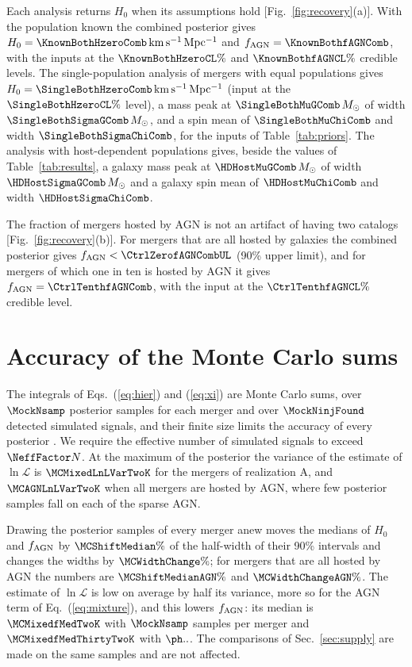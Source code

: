 \documentclass[aps,prd,reprint,superscriptaddress,nofootinbib,nolongbibliography,floatfix]{revtex4-2}
\newcommand{\kms}{\,\mathrm{km\,s^{-1}\,Mpc^{-1}}}
\newcommand{\Msun}{M_\odot}
\newcommand{\fagn}{f_{\rm AGN}}
\begin{document}
Each analysis returns $H_0$ when its assumptions hold [Fig.~\ref{fig:recovery}(a)]. %
With the population known the combined posterior gives $H_0=\KnownBothHzeroComb\kms$ and $\fagn=\KnownBothfAGNComb$, with the inputs at the $\KnownBothHzeroCL\%$ and $\KnownBothfAGNCL\%$ credible levels.
The single-population analysis of mergers with equal populations gives $H_0=\SingleBothHzeroComb\kms$ (input at the $\SingleBothHzeroCL\%$ level), a mass peak at $\SingleBothMuGComb\,\Msun$ of width $\SingleBothSigmaGComb\,\Msun$, and a spin mean of $\SingleBothMuChiComb$ and width $\SingleBothSigmaChiComb$, for the inputs of Table~\ref{tab:priors}.
The analysis with host-dependent populations gives, beside the values of Table~\ref{tab:results}, a galaxy mass peak at $\HDHostMuGComb\,\Msun$ of width $\HDHostSigmaGComb\,\Msun$ and a galaxy spin mean of $\HDHostMuChiComb$ and width $\HDHostSigmaChiComb$.

The fraction of mergers hosted by AGN is not an artifact of having two catalogs [Fig.~\ref{fig:recovery}(b)]. %
For mergers that are all hosted by galaxies the combined posterior gives $\fagn<\CtrlZerofAGNCombUL$ (90\% upper limit), and for mergers of which one in ten is hosted by AGN it gives $\fagn=\CtrlTenthfAGNComb$, with the input at the $\CtrlTenthfAGNCL\%$ credible level. %

\section{Accuracy of the Monte Carlo sums}
\label{app:mc}

The integrals of Eqs.~(\ref{eq:hier}) and (\ref{eq:xi}) are Monte Carlo sums, over $\MockNsamp$ posterior samples for each merger and over $\MockNinjFound$ detected simulated signals, and their finite size limits the accuracy of every posterior \cite{Farr:2019rap,Essick:2022ojx,Talbot:2023pex}.
We require the effective number of simulated signals \cite{Farr:2019rap} to exceed $\NeffFactor N$.
At the maximum of the posterior the variance of the estimate of $\ln\mathcal{L}$ is $\MCMixedLnLVarTwoK$ for the mergers of realization A, and $\MCAGNLnLVarTwoK$ when all mergers are hosted by AGN, where few posterior samples fall on each of the sparse AGN. %

Drawing the posterior samples of every merger anew moves the medians of $H_0$ and $\fagn$ by $\MCShiftMedian\%$ of the half-width of their 90\% intervals and changes the widths by $\MCWidthChange\%$; for mergers that are all hosted by AGN the numbers are $\MCShiftMedianAGN\%$ and $\MCWidthChangeAGN\%$.
The estimate of $\ln\mathcal{L}$ is low on average by half its variance, more so for the AGN term of Eq.~(\ref{eq:mixture}), and this lowers $\fagn$: its median is $\MCMixedfMedTwoK$ with $\MockNsamp$ samples per merger and $\MCMixedfMedThirtyTwoK$ with $\MCNsampHi$. %
The comparisons of Sec.~\ref{sec:supply} are made on the same samples and are not affected.


\end{document}
